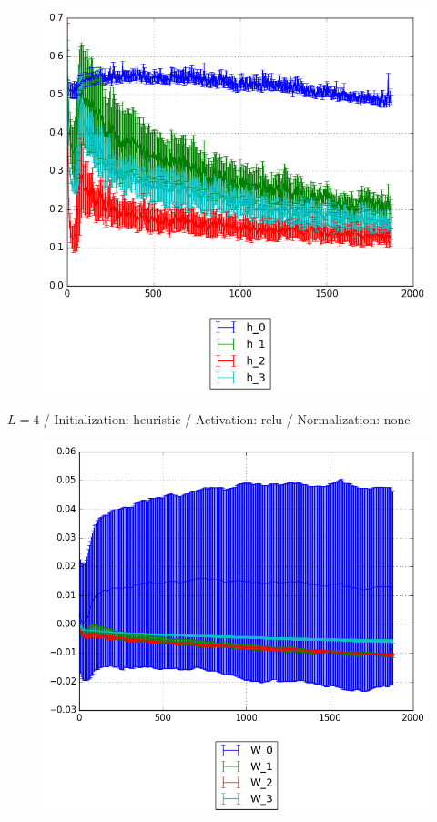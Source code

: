 \documentclass{beamer}
\begin{document}
{\begin{frame}[t]{}{}
\begin{figure}
    			\includegraphics[scale=0.4]{gfx/l4b32_relu_heuristic_identity_cnn_activations}
    		\end{figure}
    		\vfill
	\end{frame}
	\begin{frame}[t]{}{}%
		\vfill
		\begin{center}
			{$L = 4$ / Initialization: heuristic / Activation: relu / Normalization: none}
		\end{center}
    		\begin{figure}
    			\centering
    			\includegraphics[scale=0.4]{gfx/l4b32_relu_heuristic_identity_cnn_weights}
    		\end{figure}
    		\vfill
	\end{frame}
	
}
\end{document}
